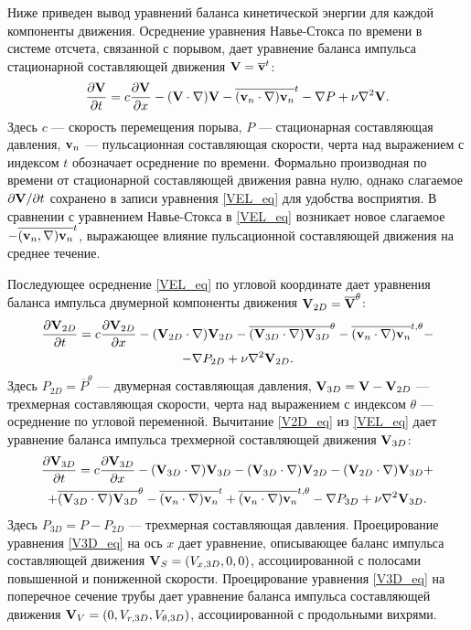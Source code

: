 Ниже приведен вывод уравнений баланса кинетической энергии для каждой компоненты движения. 
Осреднение уравнения Навье-Стокса по времени в системе отсчета, связанной с порывом, дает уравнение баланса импульса стационарной составляющей движения $\mathbf{V} = \overline{\mathbf{v}}^t$:
\begin{equation} \label{VEL_eq}
\frac{\partial \mathbf{V}}{\partial t} = c \frac{\partial \mathbf{V}}{\partial x} - (\mathbf{V} \cdot \nabla) \mathbf{V} - \overline{(\mathbf{v}_n \cdot \nabla) \mathbf{v}_n}^t - \nabla P + \nu \nabla^2 \mathbf{V}.
\end{equation}
Здесь $c$ --- скорость перемещения порыва, $P$ --- стационарная составляющая давления, $\mathbf{v}_n$ --- пульсационная составляющая скорости, черта над выражением с индексом $t$ обозначает осреднение по времени. Формально производная по времени от стационарной составляющей движения равна нулю, однако слагаемое $\partial \mathbf{V}/ \partial t$ сохранено в записи уравнения \eqref{VEL_eq} для удобства восприятия. В сравнении с уравнением Навье-Стокса в \eqref{VEL_eq} возникает новое слагаемое $-\overline{(\mathbf{v}_n, \nabla) \mathbf{v}_n}^t$, выражающее влияние пульсационной составляющей движения на среднее течение. 

Последующее осреднение \eqref{VEL_eq} по угловой координате дает уравнения баланса импульса двумерной компоненты движения $\mathbf{V}_{2D} = \overline{\mathbf{V}}^\theta$:
\begin{multline} \label{V2D_eq}
\frac{\partial \mathbf{V}_{2D}}{\partial t} = c \frac{\partial \mathbf{V}_{2D}}{\partial x} - (\mathbf{V}_{2D} \cdot \nabla) \mathbf{V}_{2D} - \overline{(\mathbf{V}_{3D} \cdot \nabla) \mathbf{V}_{3D}}^{\theta} - \overline{(\mathbf{v}_n \cdot \nabla) \mathbf{v}_n}^{t,\theta} - \\ - \nabla P_{2D} + \nu \nabla^2 \mathbf{V}_{2D}.
\end{multline}
Здесь $P_{2D} = \overline{P}^{\theta}$ --- двумерная составляющая давления, $\mathbf{V}_{3D} = \mathbf{V} - \mathbf{V}_{2D}$ --- трехмерная составляющая скорости, черта над выражением с индексом $\theta$ --- осреднение по угловой переменной. Вычитание \eqref{V2D_eq} из \eqref{VEL_eq} дает уравнение баланса импульса трехмерной составляющей движения $\mathbf{V}_{3D}$:
\begin{multline} \label{V3D_eq}
\frac{\partial \mathbf{V}_{3D}}{\partial t} = c \frac{\partial \mathbf{V}_{3D}}{\partial x} - (\mathbf{V}_{3D} \cdot \nabla) \mathbf{V}_{3D} - (\mathbf{V}_{3D} \cdot \nabla) \mathbf{V}_{2D} - (\mathbf{V}_{2D} \cdot \nabla) \mathbf{V}_{3D} + \\ + \overline{(\mathbf{V}_{3D} \cdot \nabla) \mathbf{V}_{3D}}^{\theta} - \overline{(\mathbf{v}_n \cdot \nabla) \mathbf{v}_n}^{t} + \overline{(\mathbf{v}_n \cdot \nabla) \mathbf{v}_n}^{t, \theta} - \nabla P_{3D} + \nu \nabla^2 \mathbf{V}_{3D}.
\end{multline}
Здесь $P_{3D} = P - P_{2D}$ --- трехмерная составляющая давления. Проецирование уравнения \eqref{V3D_eq} на ось $x$ дает уравнение, описывающее баланс импульса составляющей движения $\mathbf{V}_S = (V_{x,3D}, 0, 0)$, ассоциированной с полосами повышенной и пониженной скорости. Проецирование уравнения \eqref{V3D_eq} на поперечное сечение трубы дает уравнение баланса импульса составляющей движения $\mathbf{V}_V = (0, V_{r,3D}, V_{\theta,3D})$, ассоциированной с продольными вихрями. 

